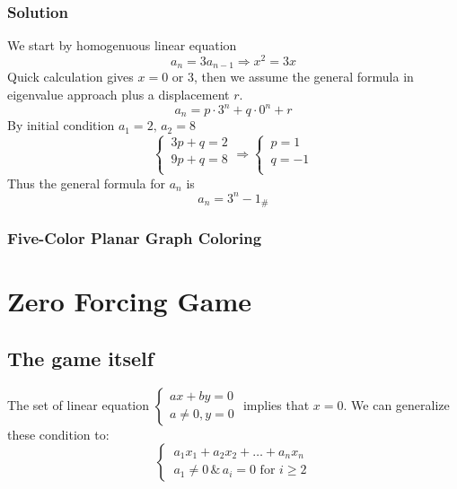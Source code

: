 \documentclass[11pt]{article}
\begin{document}
\subsubsection*{Solution}
We start by  homogenuous linear equation
\[
    a_n=3a_{n-1}\Rightarrow x^2=3x
\]
Quick calculation gives $\displaystyle x=0 \text{ or }3$, then we assume the general formula in eigenvalue approach plus a displacement $r$.
\[
    a_n=p\cdot 3^n + q\cdot 0^n + r
\]
By initial condition $a_1 = 2,\, a_2 = 8$
\[
    \begin{cases}
        \displaystyle
        \,3p+q=2\\
        \displaystyle
        \,9p+q=8\\
    \end{cases}
    \Rightarrow
    \begin{cases}
        \displaystyle
        \,p=1\\
        \displaystyle
        \,q=-1\\
    \end{cases}
\]
Thus the general formula for $a_n$ is 
\[
    a_n = 3^n - 1 _\#
\]
\subsubsection{Five-Color Planar Graph Coloring}




\section{Zero Forcing Game}
\subsection{The game itself}
The set of linear equation 
$\begin{cases}
    ax+by=0\\
    a\neq 0, y= 0
\end{cases}$ implies that $x=0$. We can generalize these condition to: 
\[
    \begin{cases}
        \displaystyle
        \,a_1x_1+a_2x_2+\dots+a_nx_n\\
        \displaystyle
        \,a_1 \neq 0 \, \& \, a_i = 0 \text{ for } i \geq 2
    \end{cases}
\]
\end{document}
